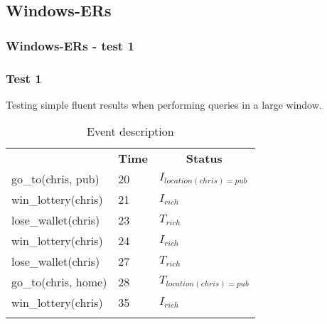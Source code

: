 \documentclass[8pt]{beamer}
\begin{document}
\subsection{Windows-ERs}
\begin{frame}
    \frametitle{Windows-ERs - test 1}
    \subsubsection{Test 1}
    \small
    Testing simple fluent results when performing queries in a large window.
    \begin{minipage}{0.48\linewidth}
        \begin{table}[t!]
            \caption{Event description}
            \begin{center}

                \begin{tabular}{lll}
                    \hline\noalign{\smallskip}
                    \multicolumn{1}{l}{\textbf{Event}} & \multicolumn{1}{c}{\textbf{Time}} & \multicolumn{1}{c}{\textbf{Status}}  \\
                    go\_to(chris, pub)& 20 & $I_{location(chris)=pub}$\\
                    win\_lottery(chris)&21 &$I_{rich}$\\
                    lose\_wallet(chris)& 23 &$T_{rich}$\\
                    win\_lottery(chris)& 24 &$I_{rich}$\\
                    lose\_wallet(chris)& 27 &$T_{rich}$\\
                    go\_to(chris, home)& 28 &$T_{location(chris)=pub}$\\
                    win\_lottery(chris)& 35&$I_{rich}$\\
                    \noalign{\smallskip}
                    \hline
                \end{tabular}
            \end{center}
        \end{table}


    \end{minipage}
    \begin{minipage}{0.48\linewidth}


\end{minipage}
\end{frame}
\end{document}
